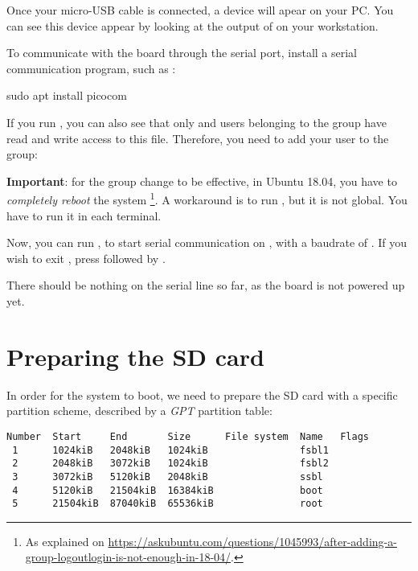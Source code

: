 Once your micro-USB cable is connected, a  device
will apear on your PC. You can see this device appear by looking at
the output of  on your workstation.

To communicate with the board through the serial port, install a
serial communication program, such as :

\begin{bashinput}
sudo apt install picocom
\end{bashinput}

If you run , you can also see that only
 and users belonging to the  group have read
and write access to this file. Therefore, you need to add your user to
the  group:


{\bf Important}: for the group change to be effective, in Ubuntu 18.04, you have to
{\em completely reboot} the system \footnote{As explained on
\url{https://askubuntu.com/questions/1045993/after-adding-a-group-logoutlogin-is-not-enough-in-18-04/}.}.
A workaround is to run , but it is not global.
You have to run it in each terminal.

Now, you can run , to start
serial communication on , with a baudrate of
. If you wish to exit , press
\code{[Ctrl][a]} followed by \code{[Ctrl][x]}.

There should be nothing on the serial line so far, as the board is not
powered up yet.

\section{Preparing the SD card}

In order for the system to boot, we need to prepare the SD card with a
specific partition scheme, described by a {\em GPT} partition table:

\begin{verbatim}
Number  Start     End       Size      File system  Name   Flags
 1      1024kiB   2048kiB   1024kiB                fsbl1
 2      2048kiB   3072kiB   1024kiB                fsbl2
 3      3072kiB   5120kiB   2048kiB                ssbl
 4      5120kiB   21504kiB  16384kiB               boot
 5      21504kiB  87040kiB  65536kiB               root
\end{verbatim}

